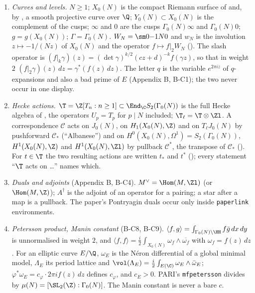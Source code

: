 \begin{convention}\label{conv:moddeg:setup}
\leavevmode
\begin{enumerate}[label=(C\arabic*)]
\item \emph{Curves and levels.} $N\ge1$; $X_0(N)$ is the compact Riemann surface of  and, by , a smooth
projective curve over $\Q$; $Y_0(N)\subset X_0(N)$ is the complement of the cusps; $\infty$ and $0$ are the cusps $\Gamma_0(N)\infty$ and $\Gamma_0(N)0$;
$g=g(X_0(N))$; $\Gamma=\Gamma_0(N)$. $W_N=\sm0{-1}N0$ and $w_N$ is the involution $z\mapsto-1/(Nz)$ of $X_0(N)$ and the operator $f\mapsto f|_2W_N$
(). The slash operator is $(f|_k\gamma)(z)=(\det\gamma)^{k/2}(cz+d)^{-k}f(\gamma z)$, so that in weight $2$
$(f|_2\gamma)(z)\,dz=\gamma^*(f(z)\,dz)$. The letter $q$ is the variable $e^{2\pi iz}$ of $q$-expansions and also a bad prime of $E$
(Appendix B, B-C1); the two never occur in one display.
\item \emph{Hecke actions.} $\T=\Z[T_n:n\ge1]\subset\End_\C S_2(\Gamma_0(N))$ is the full Hecke algebra of , the operators $U_p=T_p$ for
$p\mid N$ included; $\T_\ell=\T\otimes\Zl$. A correspondence $\mathcal C$ acts on $J_0(N)$, on $H_1(X_0(N),\Z)$ and on $T_\ell J_0(N)$ by pushforward
$\mathcal C_*$ (``Albanese'') and on $H^0(X_0(N),\Omega^1)=S_2(\Gamma_0(N))$, $H^1(X_0(N),\Z)$ and $H^1(X_0(N),\Zl)$ by pullback $\mathcal C^*$, the transpose of
$\mathcal C_*$ (). For $t\in\T$ the two resulting actions are written $t_*$ and $t^*$ (); every
statement ``$\T$ acts on \dots'' names which.
\item \emph{Duals and adjoints} (Appendix B, B-C4). $M^\vee=\Hom(M,\Zl)$ (or $\Hom(M,\Z)$); $A^\dagger$ is the adjoint of an operator for a pairing;
a star after a map is a pullback. The paper's Pontryagin duals occur only inside \texttt{paperlink} environments.
\item \emph{Petersson product, Manin constant} (B-C8, B-C9). $\langle f,g\rangle=\int_{\Gamma_0(N)\backslash\HH}f\bar g\,dx\,dy$ is unnormalised in weight
$2$, and $\langle f,f\rangle=\frac i2\int_{X_0(N)}\omega_f\wedge\overline{\omega_f}$ with $\omega_f=f(z)\,dz$. For an elliptic curve $E/\Q$, $\omega_E$ is the N\'eron
differential of a global minimal model, $\Lambda_E$ its period lattice and $\vol(\Lambda_E)=\frac i2\int_{E(\C)}\omega_E\wedge\bar\omega_E$; $\varphi^*\omega_E=c_\varphi\cdot2\pi if(z)\,dz$
defines $c_\varphi$, and $c_E>0$. PARI's \texttt{mfpetersson} divides by $\mu(N)=[\SL_2(\Z):\Gamma_0(N)]$. The Manin constant is never a bare $c$.

\end{enumerate}
\end{convention}
